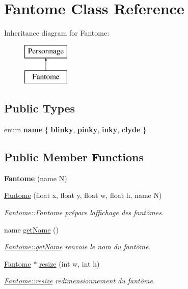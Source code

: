 \hypertarget{class_fantome}{}\section{Fantome Class Reference}
\label{class_fantome}
Inheritance diagram for Fantome\+:\begin{figure}[H]
\begin{center}
\leavevmode
\includegraphics[height=2.000000cm]{class_fantome}
\end{center}
\end{figure}
\subsection*{Public Types}
\begin{DoxyCompactItemize}
\item 
\hypertarget{class_fantome_a4221ad1458bf13cefa0c33a477e548be}{}enum {\bfseries name} \{ {\bfseries blinky}, 
{\bfseries pinky}, 
{\bfseries inky}, 
{\bfseries clyde}
 \}\label{class_fantome_a4221ad1458bf13cefa0c33a477e548be}

\end{DoxyCompactItemize}
\subsection*{Public Member Functions}
\begin{DoxyCompactItemize}
\item 
\hypertarget{class_fantome_ad5a64d4dcf429453c95dd01caf6b1d8f}{}{\bfseries Fantome} (name N)\label{class_fantome_ad5a64d4dcf429453c95dd01caf6b1d8f}

\item 
\hyperlink{class_fantome_a1e2a66978228bd309af600a7d7d3c9d8}{Fantome} (float x, float y, float w, float h, name N)
\begin{DoxyCompactList}\small\item\em Fantome\+::\+Fantome prépare l\textquotesingle{}affichage des fantômes. \end{DoxyCompactList}\item 
name \hyperlink{class_fantome_a531907b77cb6efebed53a67e0a66a12e}{get\+Name} ()
\begin{DoxyCompactList}\small\item\em \hyperlink{class_fantome_a531907b77cb6efebed53a67e0a66a12e}{Fantome\+::get\+Name} renvoie le nom du fantôme. \end{DoxyCompactList}\item 
\hyperlink{class_fantome}{Fantome} $\ast$ \hyperlink{class_fantome_aeed02df3c2f8a8942f88120a2722aabe}{resize} (int w, int h)
\begin{DoxyCompactList}\small\item\em \hyperlink{class_fantome_aeed02df3c2f8a8942f88120a2722aabe}{Fantome\+::resize} redimensionnement du fantôme. \end{DoxyCompactList}\end{DoxyCompactItemize}

